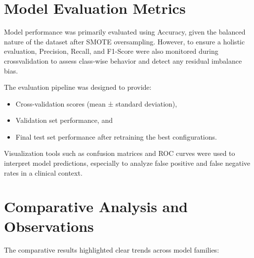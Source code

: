 \section{Model Evaluation Metrics}\label{sec:model-evaluation-metrics}

Model performance was primarily evaluated using Accuracy, given the balanced nature of the dataset after SMOTE oversampling.
However, to ensure a holistic evaluation, Precision, Recall, and F1-Score were also monitored during crossvalidation to assess class-wise behavior and detect any residual imbalance bias.

The evaluation pipeline was designed to provide:

\begin{itemize}
    \item Cross-validation scores (mean ± standard deviation),
    \item Validation set performance, and
    \item Final test set performance after retraining the best configurations.
\end{itemize}

Visualization tools such as confusion matrices and ROC curves were used to interpret model predictions, especially to analyze false positive and false negative rates in a clinical context.


\section{Comparative Analysis and Observations}\label{sec:comparative-analysis-and-observations}
The comparative results highlighted clear trends across model families:

